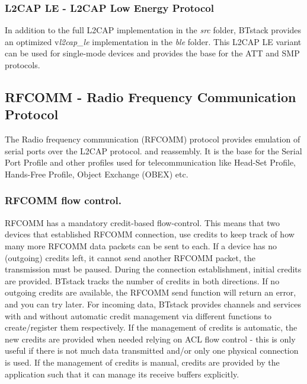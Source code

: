 
\subsubsection{L2CAP LE - L2CAP Low Energy Protocol}
In addition to the full L2CAP implementation in the \emph{src} folder, BTstack provides an optimized v\emph{l2cap\_le} implementation in the \emph{ble} folder. This L2CAP LE variant can be used for single-mode devices and provides the base for the ATT and SMP protocols.



\subsection{RFCOMM - Radio Frequency Communication Protocol}
The Radio frequency communication (RFCOMM) protocol provides emulation of serial ports over the L2CAP protocol.
and reassembly. It is the base for the Serial Port Profile and other profiles used for telecommunication like Head-Set Profile, Hands-Free Profile, Object Exchange (OBEX) etc.

\subsubsection{RFCOMM flow control.}
RFCOMM has a mandatory credit-based flow-control. This means that two devices that established RFCOMM connection, use credits to keep track of how many more RFCOMM data packets can be sent to each. If a device has no (outgoing) credits left, it cannot send another RFCOMM packet, the transmission must be paused. During the connection establishment, initial credits are provided. BTstack tracks the number of credits in both directions. If no outgoing credits are available, the RFCOMM send function will return an error, and you can try later. For incoming data, BTstack provides channels and services with and without automatic credit management via different functions to create/register them respectively. If the management of credits is automatic, the new credits are provided when needed relying on ACL flow control - this is only useful if there is not much data transmitted and/or only one physical connection is used. If the management of credits is manual, credits are provided by the application such that it can manage its receive buffers explicitly. 

\\
\\
\\
\\

